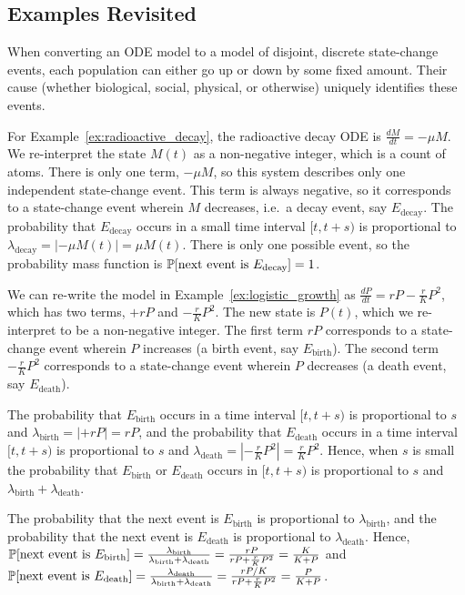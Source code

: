 \subsection{Examples Revisited}
\label{sec:events_in_odes}


When converting an ODE model to a model of disjoint, discrete state-change events, each population can either go up or down by some fixed amount. Their cause (whether biological, social, physical, or otherwise) uniquely identifies these events.

For Example~\ref{ex:radioactive_decay}, the radioactive decay ODE is $\frac{dM}{dt} = -\mu M$. We re-interpret the state $M(t)$ as a non-negative integer, which is a count of atoms. There is only one term, $-\mu M$, so this system describes only one independent state-change event. This term is always negative, so it corresponds to a state-change event wherein $M$ decreases, i.e.\ a decay event, say $E_{\mathrm{decay}}$. The probability that $E_{\mathrm{decay}}$ occurs in a small time interval $[t, t+s)$ is proportional to $\lambda_{\mathrm{decay}} = \left|-\mu M(t)\right| = \mu M(t)$. There is only one possible event, so the probability mass function is $\mathbb{P}[\textup{next event is }E_{\mathrm{decay}}] = 1$.

We can re-write the model in Example~\ref{ex:logistic_growth} as $\frac{dP}{dt} = rP - \frac{r}{K}P^2$, which has two terms, $+rP$ and $-\frac{r}{K}P^2$. The new state is $P(t)$, which we re-interpret to be a non-negative integer. The first term $rP$ corresponds to a state-change event wherein $P$ increases (a birth event, say $E_{\mathrm{birth}}$). The second term $-\frac{r}{K}P^2$ corresponds to a state-change event wherein $P$ decreases (a death event, say $E_{\mathrm{death}}$).

The probability that $E_{\mathrm{birth}}$ occurs in a time interval $[t, t+s)$ is proportional to $s$ and $\lambda_{\mathrm{birth}} = \left|+rP\right| = rP$, and the probability that $E_{\mathrm{death}}$ occurs in a time interval $[t, t+s)$ is proportional to $s$ and $\lambda_{\mathrm{death}} = \left|-\frac{r}{K}P^2\right| = \frac{r}{K}P^2$. Hence, when $s$ is small the probability that $E_{\mathrm{birth}}$ or $E_{\mathrm{death}}$ occurs in $[t, t+s)$ is proportional to $s$ and $\lambda_{\mathrm{birth}}+\lambda_{\mathrm{death}}$.

The probability that the next event is $E_{\mathrm{birth}}$ is proportional to $\lambda_{\mathrm{birth}}$, and the probability that the next event is $E_{\mathrm{death}}$ is proportional to $\lambda_{\mathrm{death}}$. Hence, $\mathbb{P}[\textup{next event is }E_{\mathrm{birth}}] = \frac{\lambda_{\mathrm{birth}}}{\lambda_{\mathrm{birth}}+\lambda_{\mathrm{death}}} = \frac{rP}{rP + \frac{r}{K}P^2} = \frac{K}{K+P}$ and $\mathbb{P}[\textup{next event is }E_{\mathrm{death}}] = \frac{\lambda_{\mathrm{death}}}{\lambda_{\mathrm{birth}}+\lambda_{\mathrm{death}}} = \frac{rP/K}{rP + \frac{r}{K}P^2} = \frac{P}{K+P}$.

